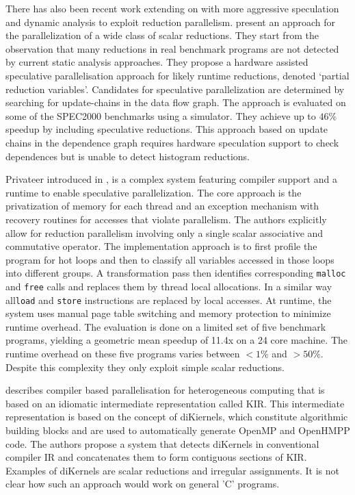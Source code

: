     There has also been recent work extending on \citet{rauchwerger1999lrpd}
    with more aggressive speculation and dynamic analysis
    \citep{aguilar2015unified} to exploit reduction parallelism.
    \citet{Han2010Speculative} present an approach for the
    parallelization of a wide class of scalar reductions.
    They start from the observation that many reductions in real benchmark
    programs are not detected by current static analysis approaches.
    They propose a hardware assisted speculative parallelisation approach for
    likely runtime reductions, denoted `partial reduction variables'.
    Candidates for speculative parallelization are determined by searching for
    update-chains in the data flow graph.
    The approach is evaluated on some of the SPEC2000 benchmarks using a
    simulator.
    They achieve up to $46\%$ speedup by including speculative reductions.
    This approach
    based on update chains in the dependence graph requires hardware
    speculation support to check dependences but is unable to detect
    histogram reductions.

    Privateer introduced in \cite{Johnson:2012:SSP:2254064.2254107}, is a
    complex system featuring compiler support and a runtime to enable
    speculative parallelization.
    The core approach is the privatization of memory for each thread and an
    exception mechanism with recovery routines for accesses that violate
    parallelism.
    The authors explicitly allow for reduction parallelism involving only a
    single scalar associative and commutative operator.
    The implementation approach is to first profile the program for hot loops
    and then to classify all variables accessed in those loops into different
    groups.
    A transformation pass then identifies corresponding \texttt{malloc} and
    \texttt{free} calls and replaces them by thread local allocations.
    In a similar way all\texttt{load} and \texttt{store} instructions are
    replaced by local accesses.
    At runtime, the system uses manual page table switching and memory
    protection to minimize runtime overhead.
    The evaluation is done on a limited set of five benchmark programs, yielding
    a geometric mean speedup of 11.4x on a 24 core machine.
    The runtime overhead on these five programs varies between $<1\%$ and
    $>50\%$.
    Despite this complexity they only exploit simple scalar reductions.

    \citet{Andion2015Compilation} describes compiler based
    parallelisation for heterogeneous computing that is based on
    an idiomatic intermediate representation called KIR.
    This intermediate representation is based on the concept of
    \mbox{diKiernels}, which constitute algorithmic building blocks and are used
    to automatically generate OpenMP and OpenHMPP code.
    The authors propose a system that detects diKernels in conventional compiler
    IR and concatenates them to form contiguous sections of KIR.
    Examples of diKernels are scalar reductions and irregular
    assignments.
    It is not clear how such an approach would work on general 'C' programs.
